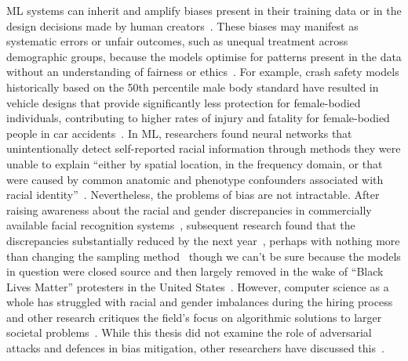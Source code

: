 ML systems can inherit and amplify biases present in their training data or in the design decisions made by human creators~\cite{bungert2023understanding,raji2019actionable}. 
These biases may manifest as systematic errors or unfair outcomes, such as unequal treatment across demographic groups, because the models optimise for patterns present in the data without an understanding of fairness or ethics~\cite{van2021fairness,van2021fairness,corbett2018measure}.
For example, crash safety models historically based on the 50th percentile male body standard have resulted in vehicle designs that provide significantly less protection for female-bodied individuals, contributing to higher rates of injury and fatality for female-bodied people in car accidents~\cite{evans2001gender}. 
In ML, researchers found neural networks that unintentionally detect self-reported racial information through methods they were unable to explain ``either by spatial location, in the frequency domain, or that were caused by common anatomic and phenotype confounders associated with racial identity''~\cite{gichoya2022ai}.
Nevertheless, the problems of bias are not intractable. 
After raising awareness about the racial and gender discrepancies in commercially available facial recognition systems~\cite{buolamwini2018gender}, subsequent research found that the discrepancies substantially reduced by the next year~\cite{raji2019actionable}, perhaps with nothing more than changing the sampling method~\cite{sadaiyandi2023stratified} though we can't be sure because the models in question were closed source and then largely removed in the wake of ``Black Lives Matter'' protesters in the United States~\cite{blm_facial_recognition}. 
However, computer science as a whole has struggled with racial and gender imbalances during the hiring process~\cite{rattan2019identical,yarger2020algorithmic} and other research critiques the field's focus on algorithmic solutions to larger societal problems~\cite{birhane2021algorithmic}.
While this thesis did not examine the role of adversarial attacks and defences in bias mitigation, other researchers have discussed this~\cite{chang2020adversarial,zhang2018mitigating,yang2022algorithmic}.

